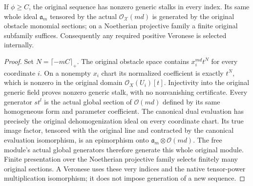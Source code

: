 \begin{proposition}
\label{prop:c0n-original-obstacle-nonzero-generation}
If $\phi\ge C$, the original sequence has nonzero generic stalks in every
index. Its same whole ideal $\mathfrak a_m$ tensored by the actual
$\mathcal O_{\mathcal X}(md)$ is generated by the original obstacle monomial
sections; on a Noetherian projective family a finite original subfamily suffices.
Consequently any required positive Veronese is selected internally.
\end{proposition}
\begin{proof}
Set $N=\lceil-mC\rceil_+$. The original obstacle space contains
$x_i^{md}t^N$ for every coordinate $i$. On a nonempty $x_i$ chart its normalized
coefficient is exactly $t^N$, which is nonzero in the original domain
$\mathcal O_X(U_i)[t]$. Injectivity into the original generic field proves
nonzero generic stalk, with no nonvanishing certificate. Every generator
$s t^l$ is the actual global section of $\mathcal O(md)$ defined by its same
homogeneous form and parameter coefficient. The canonical dual evaluation
has precisely the original dehomogenization ideal on every coordinate chart.
Its true image factor, tensored with the original line and contracted by the
canonical evaluation isomorphism, is an epimorphism onto
$\mathfrak a_m\otimes\mathcal O(md)$. The free module's actual global generators
therefore generate this whole original module. Finite presentation over the
Noetherian projective family selects finitely many original sections. A
Veronese uses these very indices and the native tensor-power multiplication
isomorphism; it does not impose generation of a new sequence.
\end{proof}

